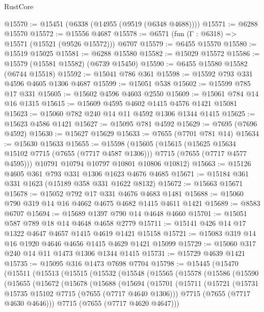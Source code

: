 \begin{lexlean}{RustCore}
\begin{coremodule}
@15570 := @15451 (@6338 (@14955 (@9519 (@6348 @4688))))
@15571 := @6288 @15570
@15572 := @15556 @4687
@15578 := @6571 (fun (Γ : @6318) => @15571 (@15521 (@9526 @15572))) @6707
@15579 := @6455 @15570
@15580 := @15519 @15025
@15581 := @6288 @15580
@15582 := @15029 @15572
@15586 := @15579 (@15581 @15582) (@6739 @15450)
@15590 := @6455 @15580 @15582 (@6744 @15518)
@15592 := @15041 @786 @361
@15598 := @15592 @793 @331 @4596 @4605 @1306 @4687
@15599 := @15051 @538
@15602 := @15599 @785 @17 @331
@15605 := @15602 @4596 @4603 @2550
@15609 := @15061 @784 @14 @16 @1315
@15615 := @15609 @4595 @4602 @1415 @4576 @1421 @15081
@15623 := @15060 @782 @240 @14 @11 @4592 @1306 @1344 @1415
@15625 := @15623 @4586 @1421
@15627 := @15095 @781 @4592
@15629 := @7695 (@7696 @4592)
@15630 := @15627 @15629
@15633 := @7655 (@7701 @781 @14)
@15634 := @15630 @15633
@15655 := @15598
    (@15605
      (@15615
        (@15625 @15634 @15102 @7715 (@7655 (@7717 @4587 @1306)))
        @7715
        (@7655 (@7717 @4577 @4595)))
      @10791
      @10794
      @10797
      @10801
      @10806
      @10812)
@15663 := @15126 @4605 @361 @793 @331 @1306 @1623 @4676 @4685
@15671 := @15184 @361 @331 @1623 (@15189 @358 @331 @1622 @8132)
@15672 := @15663 @15671
@15678 := @15052 @792 @17 @331 @4676 @4683 @1481
@15688 := @15060 @790 @319 @14 @16 @4662 @4675 @4682 @1415 @4611 @1421
@15689 := @8583 @6707
@15694 := @15689 @1397 @790 @14 @4648 @4660
@15701 := @15051 @587 @789 @18 @14 @4648 @4658 @2779
@15711 := @15141 @426 @14 @17 @1322 @4647 @4657 @1415 @4619 @1421 @15158
@15721 := @15083 @319 @14 @16 @1920 @4646 @4656 @1415 @4629 @1421 @15099
@15729 := @15060 @317 @240 @14 @11 @1473 @1306 @1344 @1415
@15731 := @15729 @4639 @1421
@15735 := @15095 @316 @1473 @7698 @7704
@15798 := @15445
    (@15470
      (@15511
        (@15513
          (@15515
            (@15532
              (@15548
                (@15565
                  (@15578
                    (@15586
                      (@15590
                        (@15655
                          (@15672
                            (@15678
                              (@15688
                                (@15694
                                  (@15701
                                    (@15711
                                      (@15721
                                        (@15731 @15735 @15102 @7715 (@7655 (@7717 @4640 @1306)))
                                        @7715
                                        (@7655 (@7717 @4630 @4646)))
                                      @7715
                                      (@7655 (@7717 @4620 @4647)))

\end{coremodule}
\end{lexlean}
